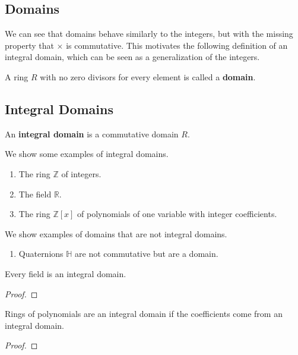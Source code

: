\subsection{Domains}

  We can see that domains behave similarly to the integers, but with the missing property that $\times$ is commutative. This motivates the following definition of an integral domain, which can be seen as a generalization of the integers. 

  \begin{definition}[Domain]
    A ring $R$ with no zero divisors for every element is called a \textbf{domain}. 
  \end{definition} 

\subsection{Integral Domains}

  \begin{definition}
    An \textbf{integral domain} is a commutative domain $R$. 
  \end{definition} 

  \begin{example}
    We show some examples of integral domains. 
    \begin{enumerate}
      \item The ring $\mathbb{Z}$ of integers. 
      \item The field $\mathbb{R}$. 
      \item The ring $\mathbb{Z}[x]$ of polynomials of one variable with integer coefficients. 
    \end{enumerate}
    We show examples of domains that are not integral domains. 
    \begin{enumerate}
      \item Quaternions $\mathbb{H}$ are not commutative but are a domain. 
    \end{enumerate}
  \end{example} 

  \begin{theorem}
    Every field is an integral domain. 
  \end{theorem}
  \begin{proof}
    
  \end{proof}

  \begin{theorem}
    Rings of polynomials are an integral domain if the coefficients come from an integral domain. 
  \end{theorem}
  \begin{proof}
    
  \end{proof} 

